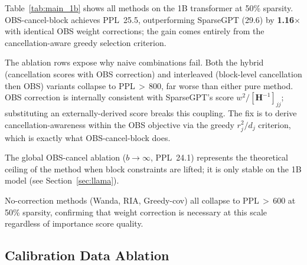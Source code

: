 \documentclass{article}
\begin{document}
Table~\ref{tab:main_1b} shows all methods on the 1B transformer at 50\%
sparsity. OBS-cancel-block achieves PPL~25.5, outperforming SparseGPT (29.6)
by \textbf{1.16$\times$} with identical OBS weight corrections; the gain
comes entirely from the cancellation-aware greedy selection criterion.

The ablation rows expose why naive combinations fail. Both the hybrid
(cancellation scores with OBS correction) and interleaved (block-level
cancellation then OBS) variants collapse to PPL\,$>$\,800, far worse than
either pure method. OBS correction is internally consistent with SparseGPT's
score $w^2/[\mathbf{H}^{-1}]_{jj}$; substituting an externally-derived score
breaks this coupling. The fix is to derive cancellation-awareness within the
OBS objective via the greedy $r_j^2/d_j$ criterion, which is exactly what
OBS-cancel-block does.

The global OBS-cancel ablation ($b\to\infty$, PPL~24.1) represents the
theoretical ceiling of the method when block constraints are lifted; it is
only stable on the 1B model (see Section~\ref{sec:llama}).

No-correction methods (Wanda, RIA, Greedy-cov) all collapse to
PPL\,$>\,$600 at 50\% sparsity, confirming that weight correction is
necessary at this scale regardless of importance score quality.

\subsection{Calibration Data Ablation}
\label{sec:calib_ablation}
\end{document}
